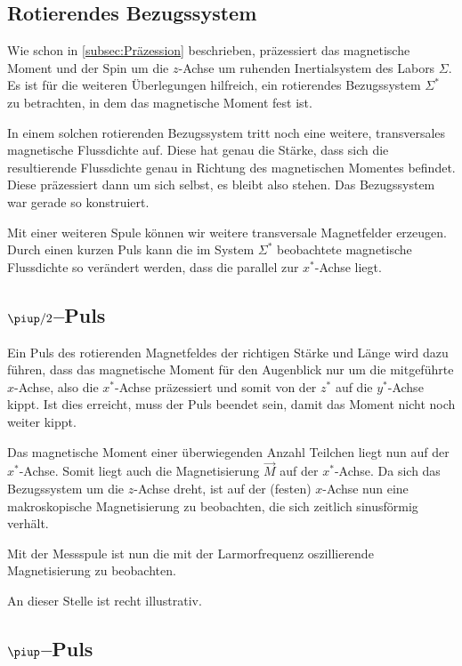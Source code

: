 \subsection{Rotierendes Bezugssystem}

Wie schon in \ref{subsec:Präzession} beschrieben, präzessiert das magnetische
Moment und der Spin um die $z$-Achse um ruhenden Inertialsystem des Labors
$\Sigma$. Es ist für die weiteren Überlegungen hilfreich, ein rotierendes
Bezugssystem $\Sigma^*$ zu betrachten, in dem das magnetische Moment fest ist.

In einem solchen rotierenden Bezugssystem tritt noch eine weitere,
transversales magnetische Flussdichte auf. Diese hat genau die Stärke, dass
sich die resultierende Flussdichte genau in Richtung des magnetischen Momentes
befindet. Diese präzessiert dann um sich selbst, es bleibt also stehen. Das
Bezugssystem war gerade so konstruiert. \parencite{teach_spin_manual}

Mit einer weiteren Spule können wir weitere transversale Magnetfelder erzeugen.
Durch einen kurzen Puls kann die im System $\Sigma^*$ beobachtete magnetische
Flussdichte so verändert werden, dass die parallel zur $x^*$-Achse liegt.

\subsection{$\piup/2$–Puls}

Ein Puls des rotierenden Magnetfeldes der richtigen Stärke und Länge wird dazu
führen, dass das magnetische Moment für den Augenblick nur um die mitgeführte
$x$-Achse, also die $x^*$-Achse präzessiert und somit von der $z^*$ auf die
$y^*$-Achse kippt. Ist dies erreicht, muss der Puls beendet sein, damit das
Moment nicht noch weiter kippt.

Das magnetische Moment einer überwiegenden Anzahl Teilchen liegt nun auf der
$x^*$-Achse. Somit liegt auch die Magnetisierung $\vec M$ auf der $x^*$-Achse.
Da sich das Bezugssystem um die $z$-Achse dreht, ist auf der (festen) $x$-Achse
nun eine makroskopische Magnetisierung zu beobachten, die sich zeitlich
sinusförmig verhält.

Mit der Messspule ist nun die mit der Larmorfrequenz oszillierende
Magnetisierung zu beobachten.

An dieser Stelle ist \cite[Abbildung~15.55 auf Seite~765]{meschede-gerthsen_24}
recht illustrativ.

\subsection{$\piup$–Puls}

